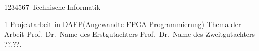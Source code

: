 \documentclass[12pt,a4paper,bibliography=totoc,listof=totoc]{scrartcl}
\begin{document}
{1234567}						%
{Technische Informatik}			%

\MyTitelseite{}
{1}								%
{Projektarbeit in DAFP(Angewandte FPGA Programmierung)}			%
{Thema der Arbeit}				%
{Prof.\ Dr.\ Name des Erstgutachters}   %
{Prof.\ Dr.\ Name des Zweitgutachters}	%
{??.??.\the\year}				%

\setcounter{page}{1} 




\tableofcontents
\pagebreak
\end{document}
